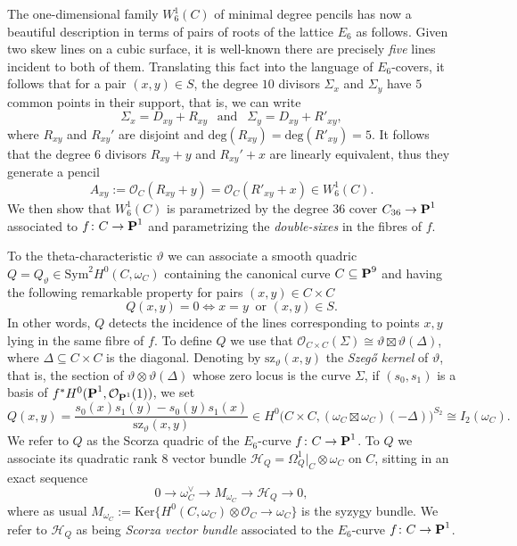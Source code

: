 \documentclass[11pt]{amsart}
\theoremstyle{definition}
\def\PP{{\textbf P}}
\def\OO{\mathcal{O}}
\def\cH{\mathcal{H}}
\begin{document}
\vskip 4pt

The one-dimensional family $W^1_6(C)$ of minimal degree pencils has now a beautiful description in terms of pairs of roots of the lattice $E_6$ as follows. Given two skew lines on a cubic surface, it is well-known there are precisely \emph{five} lines incident to both of them. Translating this fact into the language of $E_6$-covers, it follows that for a pair $(x,y)\in S$, the degree $10$ divisors $\Sigma_x$ and $\Sigma_y$ have $5$ common points in their support, that is, we can write 
$$\Sigma_x=D_{xy}+R_{xy} \ \ \mbox{ and } \ \ \Sigma_y=D_{xy}+R'_{xy},$$
where $R_{xy}$ and $R_{xy}'$ are disjoint and  $\mbox{deg}(R_{xy})=\mbox{deg}(R'_{xy})=5$. It follows that the degree $6$ divisors $R_{xy}+y$ and $R_{xy}'+x$ are linearly equivalent, thus they generate a pencil 
\begin{equation}\label{eq:pencils1}
A_{xy}:=\OO_C(R_{xy}+y)=\OO_C(R'_{xy}+x)\in W^1_6(C).
\end{equation}
We then show that $W^1_6(C)$ is parametrized by the degree $36$ cover $C_{36}\rightarrow \PP^1$ associated to $f\colon C\rightarrow \PP^1$ and parametrizing the \emph{double-sixes} in the fibres of $f$.

\vskip 5pt

 To the theta-characteristic $\vartheta$ we can associate a smooth quadric $Q=Q_{\vartheta}\in \mbox{Sym}^2 H^0(C,\omega_C)$  containing the canonical curve $C\subseteq \PP^9$ and having the following remarkable property for pairs $(x,y)\in C\times C$ 
\begin{equation}\label{eq:polar_quad}
Q(x,y)=0 \Longleftrightarrow x=y \ \mbox{ or } (x,y)\in S.
\end{equation}
In other words, $Q$ detects the incidence of the lines corresponding to points $x,y$ lying in the same fibre of $f$. To define $Q$ we use that $\OO_{C\times C}(\Sigma)\cong \vartheta\boxtimes \vartheta(\Delta)$, where $\Delta\subseteq C\times C$ is the diagonal. Denoting by $\mathrm{sz}_{\vartheta}(x,y)$ the \emph{Szeg\H{o} kernel} of $\vartheta$, that is, the section of $\vartheta\otimes \vartheta(\Delta)$ whose zero locus is the curve $\Sigma$, if $(s_0, s_1)$ is a basis of $f^*H^0(\PP^1, \OO_{\PP^1}(1))$, 
we set 
\begin{equation}\label{eq:Scorza_quadric}
Q(x,y)=\frac{s_0(x)s_1(y)-s_0(y)s_1(x)}{\mathrm{sz}_{\vartheta}(x,y)}\in H^0\bigl(C\times C, (\omega_C\boxtimes \omega_C)(-\Delta)\bigr)^{S_2}\cong I_2(\omega_C).
\end{equation}
We refer to $Q$ as the Scorza quadric of the $E_6$-curve $f\colon C\rightarrow \PP^1$. To $Q$ we associate its quadratic rank $8$ vector bundle $\cH_Q=\Omega_{Q}^1|_C\otimes\omega_C$ on $C$, sitting in an exact sequence 
\begin{equation}\label{eq:quadrbunde}
0\longrightarrow \omega_C^{\vee}\longrightarrow M_{\omega_C}\longrightarrow \cH_Q\longrightarrow 0,
\end{equation}
where as usual $M_{\omega_C}:=\mbox{Ker}\bigl\{H^0(C,\omega_C)\otimes \OO_C\rightarrow \omega_C\bigr\}$ is the syzygy bundle. We refer to $\cH_Q$ as being \emph{Scorza vector bundle} associated to the $E_6$-curve $f\colon C\rightarrow \PP^1$. 
\end{document}
